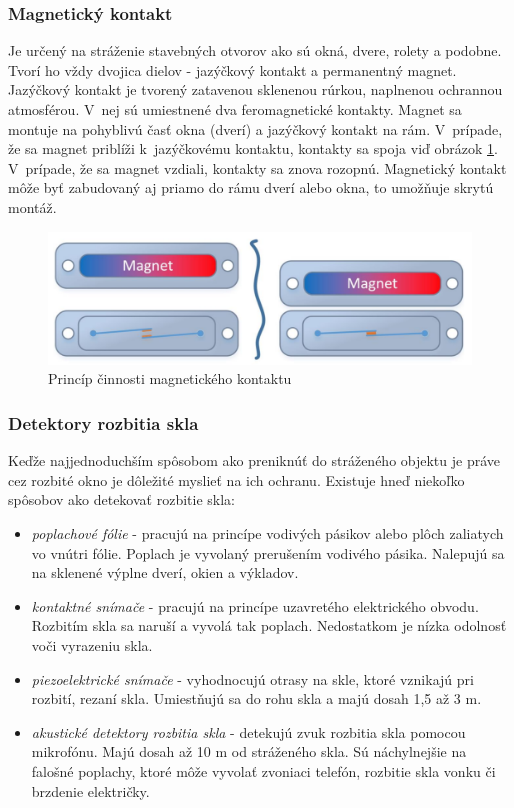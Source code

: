 \subsubsection{Magnetický kontakt}

Je určený na stráženie stavebných otvorov ako sú okná, dvere, rolety a podobne. Tvorí ho vždy dvojica dielov - jazýčkový kontakt a permanentný magnet. Jazýčkový kontakt je tvorený zatavenou sklenenou rúrkou, naplnenou ochrannou atmosférou. V~nej sú umiestnené dva feromagnetické kontakty. Magnet sa montuje na pohyblivú časť okna (dverí) a jazýčkový kontakt na rám. V~prípade, že sa magnet priblíži k~jazýčkovému kontaktu, kontakty sa spoja viď obrázok \ref{fig:magnetickykontakt}. V~prípade, že sa magnet vzdiali, kontakty sa znova rozopnú. Magnetický kontakt môže byť zabudovaný aj priamo do rámu dverí alebo okna, to umožňuje skrytú montáž.\cite{velas_ezs}

\begin{figure}[hbt]
    \centering
    \includegraphics[width=\linewidth]{obrazky-figures/magnetickykontakt.png}
    \caption[Princíp činnosti magnetického kontaktu]{Princíp činnosti magnetického kontaktu\cite{magnetickykontakt}}
    \label{fig:magnetickykontakt}
\end{figure}

\subsubsection{Detektory rozbitia skla}

Keďže najjednoduchším spôsobom ako preniknúť do stráženého objektu je práve cez rozbité okno je dôležité myslieť na ich ochranu. Existuje hneď niekoľko spôsobov ako detekovať rozbitie skla:
\begin{itemize}
    \item \textit{poplachové fólie} - pracujú na princípe vodivých pásikov alebo plôch zaliatych vo vnútri fólie. Poplach je vyvolaný prerušením vodivého pásika. Nalepujú sa na sklenené výplne dverí, okien a výkladov.
    \item \textit{kontaktné snímače} - pracujú na princípe uzavretého elektrického obvodu. Rozbitím skla sa naruší a vyvolá tak poplach. Nedostatkom je nízka odolnosť voči vyrazeniu skla.
    \item \textit{piezoelektrické snímače} - vyhodnocujú otrasy na skle, ktoré vznikajú pri rozbití, rezaní skla. Umiestňujú sa do rohu skla a majú dosah 1,5 až 3 m.
    \item \textit{akustické detektory rozbitia skla} - detekujú zvuk rozbitia skla pomocou mikrofónu. Majú dosah až 10 m od stráženého skla. Sú náchylnejšie na falošné poplachy, ktoré môže vyvolať zvoniaci telefón, rozbitie skla vonku či brzdenie električky.
\end{itemize}

